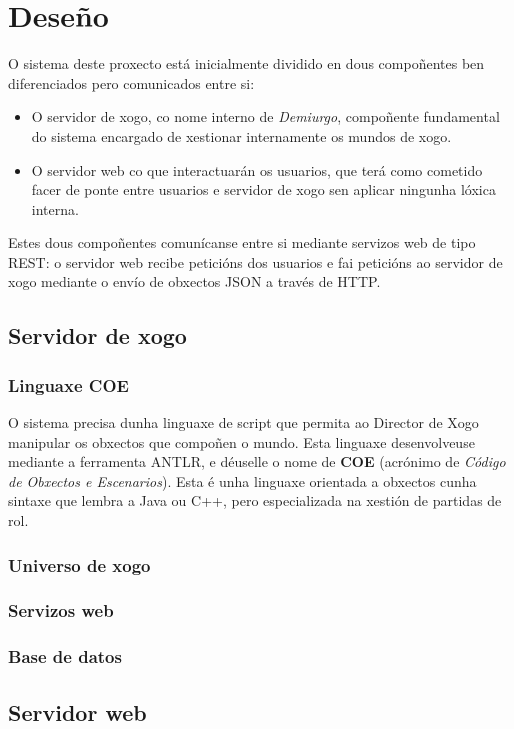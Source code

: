 \chapter{Deseño}


O sistema deste proxecto está inicialmente dividido en dous compoñentes ben
diferenciados pero comunicados entre si:
\begin{itemize}
  \item O servidor de xogo, co nome interno de {\it Demiurgo},
  compoñente fundamental do sistema encargado de xestionar internamente os
  mundos de xogo.
  \item O servidor web co que interactuarán os usuarios, que terá como cometido
  facer de ponte entre usuarios e servidor de xogo sen aplicar ningunha lóxica
  interna.
\end{itemize}

Estes dous compoñentes comunícanse entre si mediante servizos web de tipo REST:
o servidor web recibe peticións dos usuarios e fai peticións ao servidor de
xogo mediante o envío de obxectos JSON a través de HTTP.

\section{Servidor de xogo}
\subsection{Linguaxe COE}
O sistema precisa dunha linguaxe de script que permita ao Director de
Xogo manipular os obxectos que compoñen o mundo. Esta linguaxe desenvolveuse
mediante a ferramenta ANTLR, e déuselle o nome de {\bf COE} (acrónimo de {\it
Código de Obxectos e Escenarios}). Esta é unha linguaxe orientada a obxectos
cunha sintaxe que lembra a Java ou C++, pero especializada na xestión de
partidas de rol.

\subsection{Universo de xogo}

\subsection{Servizos web}

\subsection{Base de datos}

\section{Servidor web}